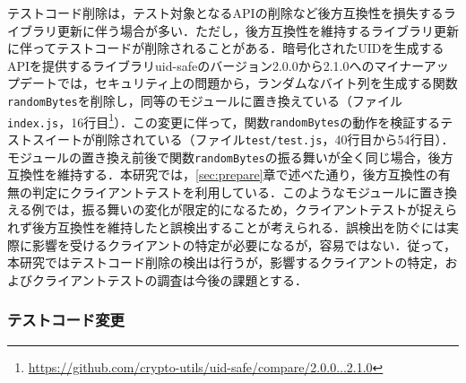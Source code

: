 \documentclass[submit]{ipsj}
\begin{document}
{テストコード削除は，テスト対象となるAPIの削除など後方互換性を損失するライブラリ更新に伴う場合が多い．ただし，後方互換性を維持するライブラリ更新に伴ってテストコードが削除されることがある．暗号化されたUIDを生成するAPIを提供するライブラリuid-safeのバージョン2.0.0から2.1.0へのマイナーアップデートでは，セキュリティ上の問題から，ランダムなバイト列を生成する関数{\verb|randomBytes|}を削除し，同等のモジュールに置き換えている（ファイル\verb|index.js|，16行目\footnote{\url{https://github.com/crypto-utils/uid-safe/compare/2.0.0...2.1.0}}）．この変更に伴って，関数{\verb|randomBytes|}の動作を検証するテストスイートが削除されている（ファイル\verb|test/test.js|，40行目から54行目\footnotemark[14]）．モジュールの置き換え前後で関数{\verb|randomBytes|}の振る舞いが全く同じ場合，後方互換性を維持する．本研究では，\ref{sec:prepare}章で述べた通り，後方互換性の有無の判定にクライアントテストを利用している．このようなモジュールに置き換える例では，振る舞いの変化が限定的になるため，クライアントテストが捉えられず後方互換性を維持したと誤検出することが考えられる．誤検出を防ぐには実際に影響を受けるクライアントの特定が必要になるが，容易ではない\cite{detecting-locations-in-js}．従って，本研究ではテストコード削除の検出は行うが，影響するクライアントの特定，およびクライアントテストの調査は今後の課題とする．

\subsubsection{テストコード変更}\label{subsec:change-test}






}
\end{document}
